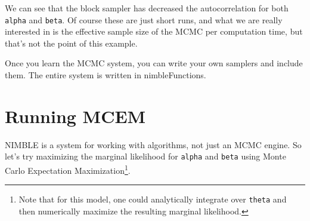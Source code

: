 \documentclass[12pt,oneside]{book}\usepackage[]{graphicx}\usepackage[]{color}
\def\cd#1{\texttt{#1}}
\begin{document}
We can see that the block sampler has decreased the 
autocorrelation for both \cd{alpha} and \cd{beta}.  Of course these
are just short runs, and what we are really interested in is the
effective sample size of the MCMC per computation time, but that's not
the point of this example.

Once you learn the MCMC system, you can write your own samplers and
include them.  The entire system is written in nimbleFunctions.

\section{Running MCEM}
\label{sec:running-mcem}

NIMBLE is a system for working with algorithms, not just an MCMC engine. So let's try maximizing the marginal likelihood for \cd{alpha} and \cd{beta} using Monte Carlo Expectation Maximization\footnote{Note that for this model, one could analytically integrate over \cd{theta} and then numerically maximize the resulting marginal likelihood.}. 
\end{document}
